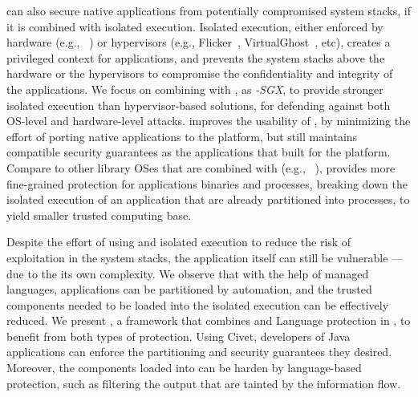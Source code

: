 \graphene{} \libos{} can also secure native applications from potentially compromised system stacks, if it is combined with isolated execution.
Isolated execution, either enforced by hardware (e.g., \intel{} \sgx{}~\citep{intelsgx}) or hypervisors (e.g., Flicker~\citep{flicker}, VirtualGhost~\citep{criswell2014virtualghost}, etc), creates a privileged context for applications,
and prevents the system stacks above the hardware or the hypervisors
to compromise the confidentiality and integrity of the applications.  
We focus on combining \graphene{} with \sgx{}, as {\em \graphene{}-SGX},
to provide stronger isolated execution than hypervisor-based solutions,
for defending against both OS-level and hardware-level attacks.
\gsgx{} improves the usability of \sgx{}, by minimizing the effort of porting native applications to the \sgx{} platform,
but still maintains compatible security guarantees as the applications that built for the platform.
Compare to other library OSes that are combined with \sgx{} (e.g., \haven{}~\citep{haven}),
\gsgx{} provides more fine-grained protection for applications binaries and processes,
breaking down the isolated execution of
an application that are already partitioned into processes,
to yield smaller trusted computing base.

Despite the effort of using \libos{} and isolated execution
to reduce the risk of exploitation in the system stacks,
the application itself can still be vulnerable
--- due to the its own complexity.
We observe that with the help of managed languages,
applications can be partitioned by automation,
and the trusted components needed to be loaded into the isolated execution
can be effectively reduced.
We present {\em \civet{}}, a framework that combines \sgx{} and Language protection in \java{},
to benefit from both types of protection.
Using Civet,
developers of Java applications can enforce the partitioning and security guarantees they desired.
Moreover, the components loaded into \sgx{} can be harden by language-based protection,
such as filtering the output
that are tainted by the information flow.

